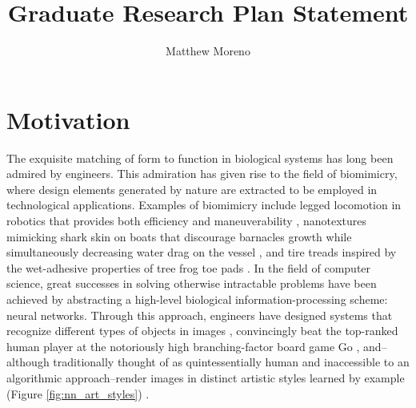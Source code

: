 \documentclass[a4paper]{article}
\title{Graduate Research Plan Statement}
\author{Matthew Moreno}
\begin{document}
\maketitle

\doublespacing

\section{Motivation} \label{sec:motivation}
The exquisite matching of form to function in biological systems has long been admired by engineers. This admiration has given rise to the field of biomimicry, where design elements generated by nature are extracted to be employed in technological applications. Examples of biomimicry include legged locomotion in robotics that provides both efficiency and maneuverability \cite{Grimes2012THE}, nanotextures mimicking shark skin on boats that discourage barnacles growth while simultaneously decreasing water drag on the vessel \cite{Stenzel2011Drag-reducingShipping}, and tire treads inspired by the wet-adhesive properties of tree frog toe pads \cite{Persson2007WetTires}. In the field of computer science, great successes in solving otherwise intractable problems have been achieved by abstracting a high-level biological information-processing scheme: neural networks. Through this approach, engineers have designed systems that recognize different types of objects in images \cite{KrizhevskyImageNetNetworks}, convincingly beat the top-ranked human player at the notoriously high branching-factor board game Go \cite{Silver2016MasteringSearch}, and--although traditionally thought of as quintessentially human and inaccessible to an algorithmic approach--render images in distinct artistic styles learned by example (Figure \ref{fig:nn_art_styles}) \cite{Gatys2015AStyle}.
\end{document}
